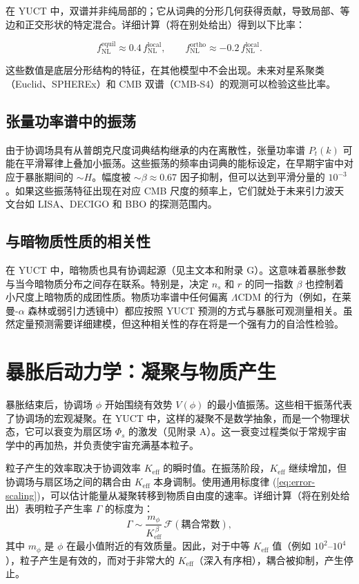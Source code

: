 \documentclass[12pt]{article}
\theoremstyle{remark}
\newcommand{\Keff}{K_{\mathrm{eff}}}
\begin{document}
	在 YUCT 中，双谱并非纯局部的；它从词典的分形几何获得贡献，导致局部、等边和正交形状的特定混合。详细计算（将在别处给出）得到以下比率：
	
	\begin{equation}
		f_{\text{NL}}^{\text{equil}} \approx 0.4\, f_{\text{NL}}^{\text{local}}, \qquad
		f_{\text{NL}}^{\text{ortho}} \approx -0.2\, f_{\text{NL}}^{\text{local}}.
		\label{eq:fnl-shapes}
	\end{equation}
	
	这些数值是底层分形结构的特征，在其他模型中不会出现。未来对星系聚类（Euclid、SPHEREx）和 CMB 双谱（CMB‑S4）的观测可以检验这些比率。
	
	\subsection{张量功率谱中的振荡}
	
	由于协调场具有从普朗克尺度词典结构继承的内在离散性，张量功率谱 $P_t(k)$ 可能在平滑幂律上叠加小振荡。这些振荡的频率由词典的能标设定，在早期宇宙中对应于暴胀期间的 $\sim H$。幅度被 $\sim \beta \approx 0.67$ 因子抑制，但可以达到平滑分量的 $10^{-3}$。如果这些振荡特征出现在对应 CMB 尺度的频率上，它们就处于未来引力波天文台如 LISA、DECIGO 和 BBO 的探测范围内。
	
	\subsection{与暗物质性质的相关性}
	
	在 YUCT 中，暗物质也具有协调起源（见主文本和附录 G）。这意味着暴胀参数与当今暗物质分布之间存在联系。特别是，决定 $n_s$ 和 $r$ 的同一指数 $\beta$ 也控制着小尺度上暗物质的成团性质。物质功率谱中任何偏离 $\Lambda$CDM 的行为（例如，在莱曼-$\alpha$ 森林或弱引力透镜中）都应按照 YUCT 预测的方式与暴胀可观测量相关。虽然定量预测需要详细建模，但这种相关性的存在将是一个强有力的自洽性检验。
	
	\section{暴胀后动力学：凝聚与物质产生}
	\label{sec:postinflation}
	
	暴胀结束后，协调场 $\phi$ 开始围绕有效势 $V(\phi)$ 的最小值振荡。这些相干振荡代表了协调场的宏观凝聚。在 YUCT 中，这样的凝聚不是数学抽象，而是一个物理状态，它可以衰变为扇区场 $\Phi_s$ 的激发（见附录 A）。这一衰变过程类似于常规宇宙学中的再加热，并负责使宇宙充满基本粒子。
	
	粒子产生的效率取决于协调效率 $\Keff$ 的瞬时值。在振荡阶段，$\Keff$ 继续增加，但协调场与扇区场之间的耦合由 $\Keff$ 本身调制。使用通用标度律 (\ref{eq:error-scaling})，可以估计能量从凝聚转移到物质自由度的速率。详细计算（将在别处给出）表明粒子产生率 $\Gamma$ 的标度为：
	\begin{equation}
		\Gamma \sim \frac{m_\phi}{\Keff^{\,\beta}} \, \mathcal{F}(\text{耦合常数}),
		\label{eq:gamma}
	\end{equation}
	其中 $m_\phi$ 是 $\phi$ 在最小值附近的有效质量。因此，对于中等 $\Keff$ 值（例如 $10^2$–$10^4$），粒子产生是有效的，而对于非常大的 $\Keff$（深入有序相），耦合被抑制，产生停止。
	
\end{document}
